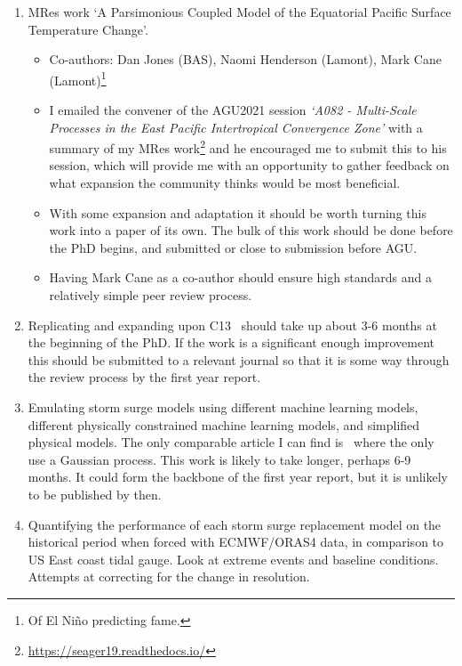\documentclass[usenames, dvipsnames]{article}      %
\begin{document}
\begin{enumerate}

    \item MRes work `A Parsimonious Coupled Model of the Equatorial Pacific Surface Temperature Change'.
    \begin{itemize}
        \item Co-authors: Dan Jones (BAS), Naomi Henderson (Lamont), Mark Cane (Lamont)\footnote{Of El Ni\~no predicting fame.}
        \item     I emailed the convener of the AGU2021 session 
        \textit{`A082 - Multi-Scale Processes in the East Pacific
        Intertropical Convergence Zone'} with a summary of my MRes
        work\footnote{\url{https://seager19.readthedocs.io/}} 
        and he encouraged me to submit this to his session, 
        which will provide me with an opportunity to gather feedback
        on what expansion the community thinks would be most beneficial.
        \item         With some expansion and adaptation it should be 
        worth turning this work into a paper of its own.
        The bulk of this work should be done before the PhD 
        begins, and submitted or close to submission before AGU.
        \item Having Mark Cane as a co-author should ensure high standards
            and a relatively simple peer review process.
    \end{itemize}
    
    \item Replicating and expanding upon
        C13~\cite{Chavas2013U.S.Perspective} 
        should take up about 3-6 months at the beginning 
        of the PhD. If the work is a significant enough 
        improvement this should be submitted to a relevant journal
        so that it is some way through the review process 
        by the first year report.
    
    \item Emulating storm surge models using different 
        machine learning models, different physically 
        constrained machine learning models, and simplified
        physical models. The only comparable article I can find
        is~\cite{Ma2020MultifidelitySurge} where the only use
        a Gaussian process. This work is likely to take longer, 
        perhaps 6-9 months. It could form the backbone
        of the first year report, but it is unlikely
        to be published by then.
    
    \item Quantifying the performance of each storm surge replacement
        model on the historical period when forced with ECMWF/ORAS4
        data, in comparison to US East coast tidal gauge. 
        Look at extreme events and baseline conditions. 
        Attempts at correcting for the change in resolution.
    

\end{enumerate}
\end{document}
